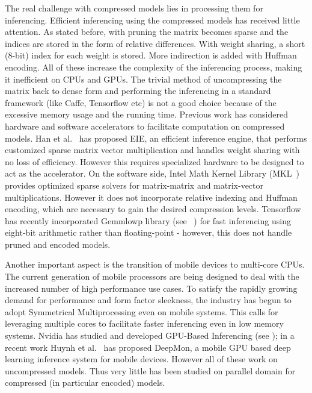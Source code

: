 The real challenge with compressed models lies in processing them for inferencing.
Efficient inferencing using the compressed models has received little attention.
As stated before, with pruning the matrix becomes sparse and the indices are stored in the form of relative differences. 
With weight sharing,  a short (8-bit) index for each weight is stored. More indirection is added with Huffman encoding.
All of these increase the complexity of the inferencing process, making it inefficient on CPUs and GPUs.
The trivial method of uncompressing the matrix back to dense form and performing the inferencing in a standard framework
(like Caffe, Tensorflow etc) is not a good choice because of the 
excessive memory usage and the running time. 
Previous work has considered hardware and software accelerators to facilitate computation on compressed models.
Han et  al.~\cite{HanLMPPHD16} has proposed EIE, an efficient inference engine, that performs
customized sparse matrix vector multiplication and handles weight sharing with no loss of efficiency. 
However this requires  specialized hardware to be designed  to act as the accelerator. 
On the software side,
Intel Math Kernel Library (MKL~\cite{mkl}) provides  optimized sparse solvers for matrix-matrix and matrix-vector multiplications.
However it does not incorporate relative indexing and Huffman encoding, which are necessary to gain the desired compression levels.
Tensorflow  has recently incorporated Gemmlowp library (see ~\cite{gemmlowp}) for fast inferencing using 
eight-bit arithmetic rather than floating-point - however, this does not handle pruned and encoded models.

Another important aspect is the transition of  mobile devices  to multi-core CPUs. 
The current generation of mobile processors are being designed to deal with the increased number of high performance use cases. 
To satisfy the rapidly growing demand for performance and form factor sleekness, the industry has begun to adopt Symmetrical
Multiprocessing even on mobile systems. This calls for leveraging
multiple cores to facilitate faster inferencing even in low memory systems. 
Nvidia has studied and developed GPU-Based Inferencing  (see \cite{2015GPUBasedDL});
in a recent work Huynh et al.~\cite{Huynh2017} has proposed 
DeepMon, a mobile GPU based deep learning inference system for mobile devices. However all of these
work on uncompressed models. Thus
very little has been studied on parallel domain for compressed (in particular encoded) models.  


